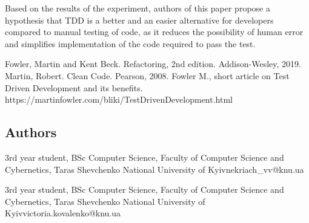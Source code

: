 \documentclass{SHVpaper}
\begin{document}
Based on the results of the experiment, authors of this paper propose a hypothesis that TDD is a better and an easier alternative for developers compared to manual testing of code, as it reduces the possibility of human error and simplifies implementation of the code required to pass the test.

\begin{thebibliography}{5}
 Fowler, Martin and Kent Beck. Refactoring, 2nd edition. Addison-Wesley, 2019. 
 Martin, Robert. Clean Code. Pearson, 2008.
 Fowler M., short article on Test Driven Development and its benefits.
https://martinfowler.com/bliki/TestDrivenDevelopment.html
\end{thebibliography}

\subsection{Authors}

\author {Vladyslav Nekriach}{3rd year student, BSc Computer Science, Faculty of Computer Science and Cybernetics, Taras Shevchenko National University of Kyiv}{nekriach\_vv@knu.ua}


\author {Victoria Kovalenko}{3rd year student, BSc Computer Science, Faculty of Computer Science and Cybernetics, Taras Shevchenko National University of Kyiv}{victoria.kovalenko@knu.ua}
\end{document}
